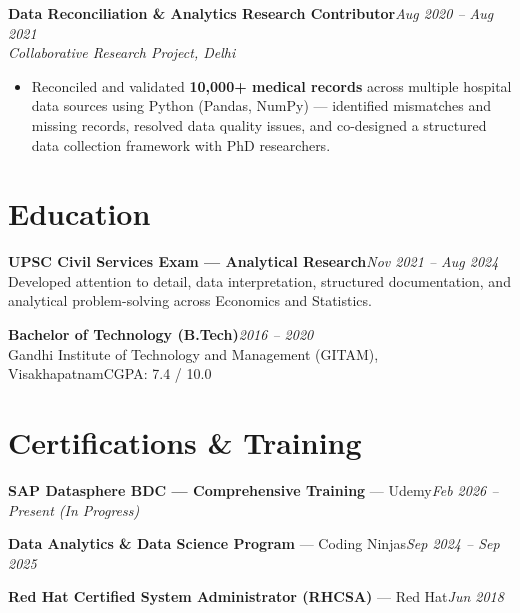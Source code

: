 \documentclass[10pt, letterpaper]{article}
\newcommand{\role}[3]{%
  \vspace{2pt}%
  {\bfseries #1}\hfill{\small\color{muted}\textit{#3}}\\[-2pt]%
  {\small\color{muted}\textit{#2}}%
}
\begin{document}
\role{Data Reconciliation \& Analytics Research Contributor}{Collaborative Research Project, Delhi}{Aug 2020 – Aug 2021}

\begin{itemize}
  \item Reconciled and validated \textbf{10,000+ medical records} across multiple hospital data sources using Python (Pandas, NumPy) — identified mismatches and missing records, resolved data quality issues, and co-designed a structured data collection framework with PhD researchers.
\end{itemize}


\section{Education}

{\bfseries UPSC Civil Services Exam — Analytical Research}\hfill{\small\color{muted}\textit{Nov 2021 – Aug 2024}}\\
{\small\color{muted}Developed attention to detail, data interpretation, structured documentation, and analytical problem-solving across Economics and Statistics.}

\vspace{2pt}
{\bfseries Bachelor of Technology (B.Tech)}\hfill{\small\color{muted}\textit{2016 – 2020}}\\
{\small\color{muted}Gandhi Institute of Technology and Management (GITAM), Visakhapatnam\hfill CGPA: 7.4 / 10.0}

\section{Certifications \& Training}

{\bfseries SAP Datasphere BDC — Comprehensive Training} — Udemy\hfill{\small\color{muted}\textit{Feb 2026 – Present \emph{(In Progress)}}}

\vspace{1pt}
{\bfseries Data Analytics \& Data Science Program} — Coding Ninjas\hfill{\small\color{muted}\textit{Sep 2024 – Sep 2025}}

\vspace{1pt}
{\bfseries Red Hat Certified System Administrator (RHCSA)} — Red Hat\hfill{\small\color{muted}\textit{Jun 2018}}

\end{document}
